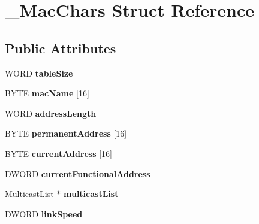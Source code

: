 \hypertarget{struct___mac_chars}{
\section{\_\-MacChars Struct Reference}
\label{struct___mac_chars}
}
\subsection*{Public Attributes}
\begin{DoxyCompactItemize}
\item 
\hypertarget{struct___mac_chars_a88c4c0bdf66481e1f037a28a5b41d4c3}{
WORD {\bfseries tableSize}}
\label{struct___mac_chars_a88c4c0bdf66481e1f037a28a5b41d4c3}

\item 
\hypertarget{struct___mac_chars_a576a8aa383818c235fe7f9a60d1afc6a}{
BYTE {\bfseries macName} \mbox{[}16\mbox{]}}
\label{struct___mac_chars_a576a8aa383818c235fe7f9a60d1afc6a}

\item 
\hypertarget{struct___mac_chars_a0a2dd8b1cd736dded114cbf0e2ff8c32}{
WORD {\bfseries addressLength}}
\label{struct___mac_chars_a0a2dd8b1cd736dded114cbf0e2ff8c32}

\item 
\hypertarget{struct___mac_chars_ad4d6710ab2ec99d48eaee543045776ef}{
BYTE {\bfseries permanentAddress} \mbox{[}16\mbox{]}}
\label{struct___mac_chars_ad4d6710ab2ec99d48eaee543045776ef}

\item 
\hypertarget{struct___mac_chars_a41bb3c48934c4b0ee7e674ed84d62f7d}{
BYTE {\bfseries currentAddress} \mbox{[}16\mbox{]}}
\label{struct___mac_chars_a41bb3c48934c4b0ee7e674ed84d62f7d}

\item 
\hypertarget{struct___mac_chars_a89534b64af91243130ee7e3abdb96d30}{
DWORD {\bfseries currentFunctionalAddress}}
\label{struct___mac_chars_a89534b64af91243130ee7e3abdb96d30}

\item 
\hypertarget{struct___mac_chars_a718e6a239e29f9e3a2945642c94ac5d4}{
\hyperlink{struct___multicast_list}{MulticastList} $\ast$ {\bfseries multicastList}}
\label{struct___mac_chars_a718e6a239e29f9e3a2945642c94ac5d4}

\item 
\hypertarget{struct___mac_chars_af25cc32f8392a4423c84a8f545a3a0c3}{
DWORD {\bfseries linkSpeed}}
\label{struct___mac_chars_af25cc32f8392a4423c84a8f545a3a0c3}


\end{DoxyCompactItemize}
